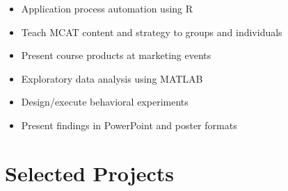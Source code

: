 \documentclass{tccv_AH}
\begin{document}
\begin{itemize}
    \itemsep-0.25em
    \item{Application process automation using R}
\end{itemize}

\medskip

\begin{itemize}
    \itemsep-0.25em
    \item{Teach MCAT content and strategy to groups and individuals}
    \item{Present course products at marketing events}
\end{itemize}

\medskip

\begin{itemize}
    \itemsep-0.25em
    \item{Exploratory data analysis using MATLAB}
    \item{Design/execute behavioral experiments}
    \item{Present findings in PowerPoint and poster formats}
\end{itemize}


\vfill



\section{Selected Projects}
\end{document}
